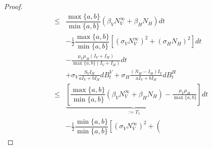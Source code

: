 \begin{proof}
\begin{equation}
\begin{aligned}
            \leq &
            \dfrac{
                \max\{
                    a, b
                \}
            }{
                \min\{
                    a, b
                \}
            }
            \left (
                \beta_V N_V ^ \infty
                +
                \beta_H N_H
            \right ) dt
            \\
            & 
            -
            \frac{1}{2}
            \dfrac{
                \max\{
                    a, b
                \}
            }{
                \min\{
                    a, b
                \}
            }
            \left[
                \left(
                    \sigma_V N_V ^ \infty
                \right) ^ 2
                +
                \left(
                    \sigma_H N_H
                \right) ^2
            \right] dt
            \\
            &
            -
            \frac{
                \mu_V \mu_H (I_V + I_H)
            }{\max \{a, b\} (I_V + I_H)}
            dt
            \\
            & +
            \sigma_V 
            \frac{S_V I_H}{a I_V + b I_H}
            d B_t ^ V
            +
            \sigma_H
            \frac{(N_H - I_H) I_V}{a I_V + b I_H}
            d B_t ^ H
            \\
            \leq &
                \underbrace{
                    \left[
                        \dfrac{
                            \max\{a, b\}
                        }{
                            \min\{a, b\}
                        }
                        \left (
                            \beta_V N_V ^ \infty
                            +
                            \beta_H N_H
                        \right )
                        -
                        \frac{
                            \mu_V \mu_H 
                        }{
                            \max \{a, b\} 
                        }
                     \right]
                }_{:= T_1}
                 dt
            \\
            &
            -
            \frac{1}{2}
                \dfrac{
                    \min\{
                        a, b
                    \}
                }{
                    \min\{
                        a, b
                    \}
                }
            \left [
                \left(
                    \sigma_V N_V ^ \infty
                \right) ^ 2
                +
                \left(

\end{aligned}
\end{equation}
\end{proof}

